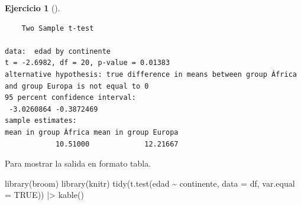 \documentclass[
  a4paper,
]{scrreport}
\newenvironment{Shaded}{\begin{snugshade}}{\end{snugshade}}
\newcommand{\AttributeTok}[1]{\textcolor[rgb]{0.40,0.45,0.13}{#1}}
\newcommand{\ConstantTok}[1]{\textcolor[rgb]{0.56,0.35,0.01}{#1}}
\newcommand{\FunctionTok}[1]{\textcolor[rgb]{0.28,0.35,0.67}{#1}}
\newcommand{\NormalTok}[1]{\textcolor[rgb]{0.00,0.23,0.31}{#1}}
\newcommand{\SpecialCharTok}[1]{\textcolor[rgb]{0.37,0.37,0.37}{#1}}
\theoremstyle{definition}
\newtheorem{exercise}{Ejercicio}[chapter]
\theoremstyle{remark}
\begin{document}
\begin{exercise}[]
\begin{enumerate}
\begin{tcolorbox}
\begin{verbatim}
    Two Sample t-test

data:  edad by continente
t = -2.6982, df = 20, p-value = 0.01383
alternative hypothesis: true difference in means between group África and group Europa is not equal to 0
95 percent confidence interval:
 -3.0260864 -0.3872469
sample estimates:
mean in group África mean in group Europa 
            10.51000             12.21667 
\end{verbatim}

  Para mostrar la salida en formato tabla.

\begin{Shaded}
\begin{Highlighting}[]
\FunctionTok{library}\NormalTok{(broom)}
\FunctionTok{library}\NormalTok{(knitr)}
\FunctionTok{tidy}\NormalTok{(}\FunctionTok{t.test}\NormalTok{(edad }\SpecialCharTok{\textasciitilde{}}\NormalTok{ continente, }\AttributeTok{data =}\NormalTok{ df, }\AttributeTok{var.equal =} \ConstantTok{TRUE}\NormalTok{)) }\SpecialCharTok{|\textgreater{}} 
    \FunctionTok{kable}\NormalTok{()}
\end{Highlighting}
\end{Shaded}


\end{tcolorbox}
\end{enumerate}
\end{exercise}
\end{document}
